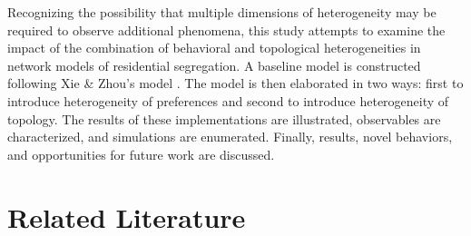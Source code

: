 \documentclass[a4paper]{article}
\begin{document}
Recognizing the possibility that multiple dimensions of heterogeneity may be required to observe additional phenomena, this study attempts to examine the impact of the combination of behavioral and topological heterogeneities in network models of residential segregation. A baseline model is constructed following Xie \& Zhou’s model \cite{xie2012modeling}. The model is then elaborated in two ways: first to introduce heterogeneity of preferences and second to introduce heterogeneity of topology. The results of these implementations are illustrated, observables are characterized, and simulations are enumerated. Finally, results, novel behaviors, and opportunities for future work are discussed.

\section{Related Literature}
\end{document}
